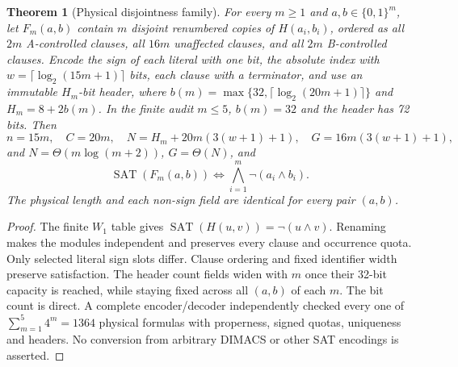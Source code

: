 \documentclass[11pt]{article}
\newtheorem{theorem}{Theorem}
\begin{document}
\begin{theorem}[Physical disjointness family]\label{th:physical}
For every $m\ge1$ and $a,b\in\{0,1\}^m$, let $F_m(a,b)$ contain $m$ disjoint renumbered copies of $H(a_i,b_i)$, ordered as all $2m$ A-controlled clauses, all $16m$ unaffected clauses, and all $2m$ B-controlled clauses. Encode the sign of each literal with one bit, the absolute index with $w=\lceil\log_2(15m+1)\rceil$ bits, each clause with a terminator, and use an immutable $H_m$-bit header, where
$b(m)=\max\{32,\lceil\log_2(20m+1)\rceil\}$ and $H_m=8+2b(m)$.
In the finite audit $m\le5$, $b(m)=32$ and the header has 72 bits. Then
\[
n=15m,\quad C=20m,\quad N=H_m+20m(3(w+1)+1),\quad
G=16m(3(w+1)+1),
\]
and $N=\Theta(m\log(m+2))$, $G=\Theta(N)$, and
\[
\operatorname{SAT}(F_m(a,b))\iff \bigwedge_{i=1}^m\neg(a_i\wedge b_i).
\]
The physical length and each non-sign field are identical for every pair $(a,b)$.
\end{theorem}
\begin{proof}
The finite $W_1$ table gives $\operatorname{SAT}(H(u,v))=\neg(u\land v)$. Renaming makes the modules independent and preserves every clause and occurrence quota. Only selected literal sign slots differ. Clause ordering and fixed identifier width preserve satisfaction. The header count fields widen with $m$ once their 32-bit capacity is reached, while staying fixed across all $(a,b)$ of each $m$. The bit count is direct. A complete encoder/decoder independently checked every one of $\sum_{m=1}^5 4^m=1364$ physical formulas with properness, signed quotas, uniqueness and headers. No conversion from arbitrary DIMACS or other SAT encodings is asserted.
\end{proof}
\end{document}
